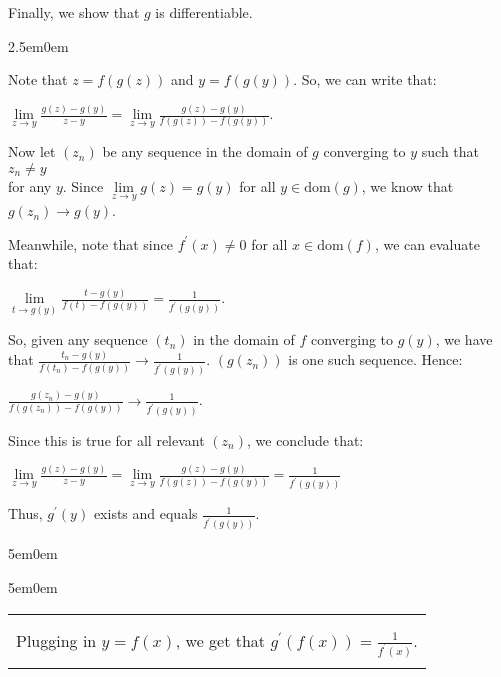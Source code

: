 \documentclass{book}
\newcommand{\pracTwo}{
   \color{Orange}%
   \fontsize{12}{14}\selectfont%
}
\newenvironment{myIndent}{%
   \begin{adjustwidth}{2.5em}{0em}%
}{%
   \end{adjustwidth}%
}
\newenvironment{myDindent}{%
   \begin{adjustwidth}{5em}{0em}%
}{%
   \end{adjustwidth}%
}
\newcommand{\domain}[1]{\mathrm{dom}(#1)}
\newenvironment{myClosureOne}[2][.]{%
   \color{#1}%
   \begin{tabular}{|p{#2in}|} \hline \\%
}{%
   \\ \hline \end{tabular}%
}
\newcommand{\retTwo}{\hfill\bigbreak}
\begin{document}
Finally, we show that $g$ is differentiable. 
{\begin{myIndent}\pracTwo
   Note that $z = f(g(z))$ and $y = f(g(y))$. So, we can write that:
   
   {\centering $\lim\limits_{z \rightarrow y}{\frac{g(z) - g(y)}{z - y}} = \lim\limits_{z \rightarrow y}{\frac{g(z) - g(y)}{f(g(z)) - f(g(y))}}$.\retTwo\par}

   Now let $(z_n)$ be any sequence in the domain of $g$ converging to $y$ such that $z_n \neq y$\\ for any $y$. Since $\lim\limits_{z \rightarrow y}g(z) = g(y)$ for all $y \in \domain{g}$, we know that $g(z_n) \rightarrow g(y)$.\retTwo

   Meanwhile, note that since $f^\prime(x) \neq 0$ for all $x \in \domain{f}$, we can evaluate that:
   
   {\centering $\lim\limits_{t \rightarrow g(y)}{\frac{t - g(y)}{f(t) - f(g(y))}} = \frac{1}{f^\prime(g(y))}$.\retTwo\par}

   So, given any sequence $(t_n)$ in the domain of $f$ converging to $g(y)$, we have\\ that $\frac{t_n - g(y)}{f(t_n) - f(g(y))} \rightarrow \frac{1}{f^\prime(g(y))}$. $(g(z_n))$ is one such sequence. Hence:
   
   {\centering $\frac{g(z_n) - g(y)}{f(g(z_n)) - f(g(y))} \rightarrow \frac{1}{f^\prime(g(y))}$. \retTwo\par}

   Since this is true for all relevant $(z_n)$, we conclude that:
   
   {\centering $\lim\limits_{z \rightarrow y}{\frac{g(z) - g(y)}{z - y}} = \lim\limits_{z \rightarrow y}{\frac{g(z) - g(y)}{f(g(z)) - f(g(y))}} = \frac{1}{f^\prime(g(y))}$\retTwo\par}

   Thus, $g^\prime(y)$ exists and equals $\frac{1}{f^\prime(g(y))}$.\retTwo
   
   \begin{myDindent}\begin{myDindent}
      \begin{myClosureOne}{3.5}
         \\ [-20pt] Plugging in $y = f(x)$, we get that $g^\prime(f(x)) = \frac{1}{f^\prime(x)}$.\\ [-8pt]
      \end{myClosureOne}\retTwo
   \end{myDindent}\end{myDindent}
\end{myIndent}}
\end{document}
